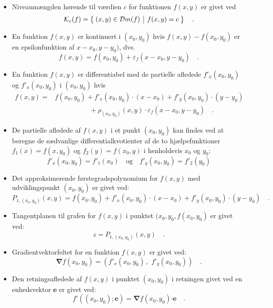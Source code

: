 \begin{summary}
\begin{itemize}
\item Niveaumængden hørende til værdien $c$ for funktionen $f(x,y)$ er givet ved
\begin{equation}
\mathcal{K}_{c}(f) = \left\lbrace \hspace*{-1mm} \begin{array}{c|c} (x,y) \in \mathcal{D}m(f) & f(x,y) = c \end{array} \hspace*{-1mm} \right\rbrace \quad .
\end{equation}
\item En funktion $f(x,y)$ er kontinuert i $(x_{0}, y_{0})$ hvis $f(x,y) - f(x_{0}, y_{0})$ er en epsilonfunktion af $x-x_{0}, y - y_{0})$, dvs.
\begin{equation}
f(x,y) = f(x_{0}, y_{0}) + \varepsilon_{f}(x - x_{0}, y-y_{0}) \quad.
\end{equation}
\item En funktion $f(x,y)$  er differentiabel med de partielle afledede $f'_{x}(x_{0}, y_{0})$ og $f'_{x}(x_{0}, y_{0})$ i $(x_{0}, y_{0})$ hvis
\begin{equation}
\begin{aligned}
f(x,y) = &f(x_{0}, y_{0}) + f'_{x}(x_{0}, y_{0})\cdot (x-x_{0}) + f'_{y}(x_{0}, y_{0})\cdot (y-y_{0}) \\
&\phantom{f(x,y) =}+ \rho_{(x_{0}, y_{0})}(x,y) \cdot \varepsilon_{f}(x-x_{0},y-y_{0}) \quad .
\end{aligned}
\end{equation}
\item De partielle afledede af $f(x,y)$ i et punkt $(x_{0}, y_{0})$ kan findes  ved at beregne de sædvanlige differentialkvotienter af de to hjælpefunktioner $f_{1}(x) = f(x, y_{0})$ og
$f_{2}(y) = f(x_{0}, y)$ i henholdsvis $x_{0}$ og $y_{0}$:
\begin{equation}
f'_{x}(x_{0}, y_{0}) = f'_{1}(x_{0}) \quad \textrm{og} \quad f'_{y}(x_{0}, y_{0}) = f'_{2}(y_{0})
\end{equation}
\item Det approksimerende førstegradspolynomium for $f(x,y)$ med udviklingspunkt $(x_{0}, y_{0})$ er givet ved:
\begin{equation}
P_{1, (x_{0}, y_{0})}(x,y) = f(x_{0}, y_{0}) + f'_{x}(x_{0}, y_{0})\cdot (x-x_{0}) + f'_{y}(x_{0}, y_{0})\cdot (y-y_{0}) \quad .
\end{equation}
\item Tangentplanen til grafen for $f(x,y)$ i punktet $(x_{0}, y_{0}, f(x_{0}, y_{0})$ er givet ved:
\begin{equation}
z = P_{1, (x_{0}, y_{0})}(x,y) \quad.
\end{equation}
\item Gradientvektorfeltet for en funktion $f(x,y)$ er givet ved:
\begin{equation}
{\bm{\nabla}}f(x_{0}, y_{0}) = \left(f'_{x}(x_{0}, y_{0})\, , \, \, f'_{y}(x_{0}, y_{0}) \right) \quad .
\end{equation}
\item Den retningsafledede af $f(x, y)$ i punktet $(x_{0}, y_{0})$ i retningen givet ved en enhedsvektor $\mathbf{e}$ er givet ved:
\begin{equation}
f'((x_{0}, y_{0}); \mathbf{e}) = {\bm{\nabla}}f(x_{0}, y_{0}) {\bm{\cdot}} \mathbf{e} \quad .
\end{equation}
\end{itemize}


\end{summary}

